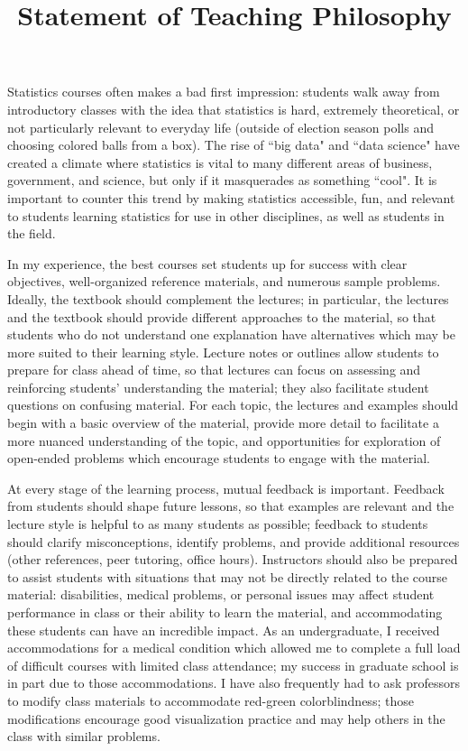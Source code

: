 \documentclass[10pt,letterpaper,sans,unicode]{moderncv}        %
\title{Statement of Teaching Philosophy}                               %
\begin{document}
\makecvtitle
\setlength{\parindent}{15pt} %

Statistics courses often makes a bad first impression: students walk away from introductory classes with the idea that statistics is hard, extremely theoretical, or not particularly relevant to everyday life (outside of election season polls and choosing colored balls from a box). The rise of ``big data" and ``data science" have created a climate where statistics is vital to many different areas of business, government, and science, but only if it masquerades as something ``cool". It is important to counter this trend by making statistics accessible, fun, and relevant to students learning statistics for use in other disciplines, as well as students in the field. 

\vspace{1cm}\hspace{12pt}
In my experience, the best courses set students up for success with clear objectives, well-organized reference materials, and numerous sample problems. Ideally, the textbook should complement the lectures; in particular, the lectures and the textbook should provide different approaches to the material, so that students who do not understand one explanation have alternatives which may be more suited to their learning style. Lecture notes or outlines allow students to prepare for class ahead of time, so that lectures can focus on assessing and reinforcing students' understanding the material; they also facilitate student questions on confusing material. For each topic, the lectures and examples should begin with a basic overview of the material, provide more detail to facilitate a more nuanced understanding of the topic, and opportunities for exploration of open-ended problems which encourage students to engage with the material.  

\vspace{1cm}\hspace{12pt}
At every stage of the learning process, mutual feedback is important. Feedback from students should shape future lessons, so that examples are relevant and the lecture style is helpful to as many students as possible; feedback to students should clarify misconceptions, identify problems, and provide additional resources (other references, peer tutoring, office hours). 
Instructors should also be prepared to assist students with situations that may not be directly related to the course material: disabilities, medical problems, or personal issues may affect student performance in class or their ability to learn the material, and accommodating these students can have an incredible impact. As an undergraduate, I received accommodations for a medical condition which allowed me to complete a full load of difficult courses with limited class attendance; my success in graduate school is in part due to those accommodations. I have also frequently had to ask professors to modify class materials to accommodate red-green colorblindness; those modifications encourage good visualization practice and may help others in the class with similar problems. 
\end{document}
